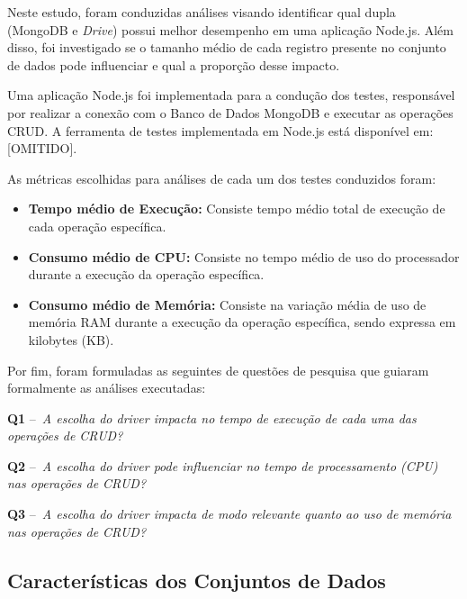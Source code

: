 \documentclass[12pt]{article}
\begin{document}
Neste estudo, foram conduzidas análises visando identificar qual dupla (MongoDB e \emph{Drive}) possui melhor desempenho em uma aplicação Node.js. 
Além disso, foi investigado se o tamanho médio de cada registro presente no conjunto de dados pode influenciar e qual a proporção desse impacto.

Uma aplicação Node.js foi implementada para a condução dos testes, responsável por realizar a conexão com o Banco de Dados MongoDB e executar as operações CRUD. A ferramenta de testes implementada em Node.js está disponível em: [OMITIDO].%

As métricas escolhidas para análises de cada um dos testes conduzidos foram:

\begin{itemize}
\item \textbf{Tempo médio de Execução:} Consiste tempo médio total de execução de cada operação específica.
\item \textbf{Consumo médio de CPU:} Consiste no tempo médio de uso do processador durante a execução da operação específica.
\item \textbf{Consumo médio de Memória:} Consiste na variação média de uso de memória RAM durante a execução da operação específica, sendo expressa em kilobytes (KB).
\end{itemize}

Por fim, foram formuladas as seguintes de questões de pesquisa que guiaram formalmente as análises executadas: 

\textbf{Q1} --~\emph{A escolha do driver impacta no tempo de execução de cada uma das operações de CRUD?}


\textbf{Q2} --~\emph{A escolha do driver pode influenciar no tempo de processamento (CPU) nas operações de CRUD?}


\textbf{Q3} --~\emph{A escolha do driver impacta de modo relevante quanto ao uso de memória nas operações de CRUD?}

\subsection{Características dos Conjuntos de Dados}
\end{document}

